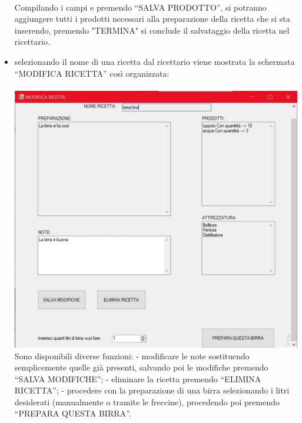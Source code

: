 \documentclass[a4paper, titlepage]{article}
\begin{document}
\begin{itemize}
    \\Compilando i campi e premendo “SALVA PRODOTTO”, si potranno aggiungere tutti i prodotti necessari alla preparazione della ricetta che si sta inserendo, premendo "TERMINA" si conclude il salvataggio della ricetta nel ricettario.
    \newpage
    \item selezionando il nome di una ricetta dal ricettario viene mostrata la schermata “MODIFICA RICETTA” così organizzata:\\\\
    \includegraphics[scale=0.30]{Immagini/form/Form Ricetta.jpg}
    \\Sono disponibili diverse funzioni:
        \subitem - modificare le note sostituendo semplicemente quelle già presenti, salvando poi le modifiche premendo “SALVA MODIFICHE”;
        \subitem - eliminare la ricetta premendo “ELIMINA RICETTA”;
        \subitem - procedere con la preparazione di una birra selezionando i litri desiderati (manualmente o tramite le freccine), procedendo poi premendo “PREPARA QUESTA BIRRA”.
\end{itemize}
\end{document}
